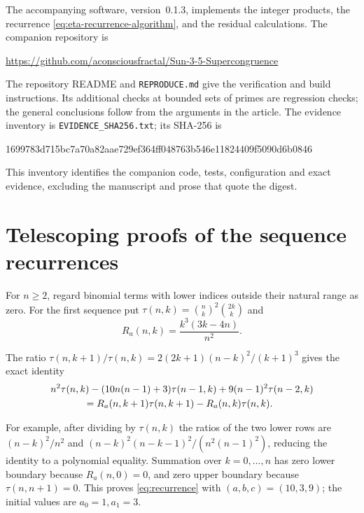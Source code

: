 \documentclass[11pt,a4paper]{article}
\theoremstyle{remark}\newtheorem{remark}[theorem]{Remark}
\begin{document}
The accompanying software, version~0.1.3, implements the integer products,
the recurrence \eqref{eq:eta-recurrence-algorithm}, and the residual
calculations. The companion repository is
\begin{center}\small
\url{https://github.com/aconsciousfractal/Sun-3-5-Supercongruence}
\end{center}
The repository README and \texttt{REPRODUCE.md} give the verification and
build instructions.
Its additional checks at bounded sets of primes are regression checks;
the general conclusions follow from the arguments in the article.
The evidence inventory is \texttt{EVIDENCE\_SHA256.txt}; its SHA-256 is
\begin{center}\footnotesize\ttfamily
1699783d715bc7a70a82aae729ef364ff048763b546e11824409f5090d6b0846
\end{center}
This inventory identifies the companion code, tests, configuration and exact
evidence, excluding the manuscript and prose that quote the digest.

\section{Telescoping proofs of the sequence recurrences}
\label{app:recurrences}
For $n\ge2$, regard binomial terms with lower indices outside their
natural range as zero. For the first sequence put
$\tau(n,k)=\binom nk^2\binom{2k}k$ and
\[
 R_a(n,k)=\frac{k^3(3k-4n)}{n^2}.
\]
\begin{samepage}
\allowdisplaybreaks[0]
The ratio
$\tau(n,k+1)/\tau(n,k)=2(2k+1)(n-k)^2/(k+1)^3$ gives the exact identity
\begin{align}\label{eq:telescoping-a}
 &n^2\tau(n,k)-(10n(n-1)+3)\tau(n-1,k)
       +9(n-1)^2\tau(n-2,k)\notag\\
 &\hspace{12mm}=R_a(n,k+1)\tau(n,k+1)-R_a(n,k)\tau(n,k).
\end{align}
\end{samepage}
For example, after dividing by $\tau(n,k)$ the ratios of the two lower
rows are $(n-k)^2/n^2$ and
$(n-k)^2(n-k-1)^2/(n^2(n-1)^2)$, reducing the identity to a polynomial
equality. Summation over $k=0,\ldots,n$ has zero lower boundary because
$R_a(n,0)=0$, and zero upper boundary because $\tau(n,n+1)=0$.
This proves \eqref{eq:recurrence} with $(a,b,c)=(10,3,9)$;
the initial values are $a_0=1,a_1=3$.
\end{document}
